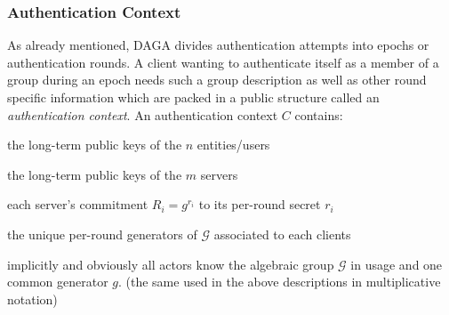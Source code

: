     \subsubsection{Authentication Context}
    \label{subsubsec:dagacontext}
    As already mentioned, DAGA divides authentication attempts into epochs or authentication rounds.
    A client wanting to authenticate itself as a member of a group during an epoch needs such a group description
    as well as other round specific information which are packed in a public structure called an \emph{authentication context}.
    \newline
    An authentication context \(C\) contains:
    \begin{description}[font=\boldmath]
        \item[\(\vec{X}\):]
            the long-term public keys of the \(n\) entities/users
        \item[\(\vec{Y}\):]
            the long-term public keys of the \(m\) servers
        \item[\textbf{\(\vec{R} = \{R_1, \ldots, R_m\}\)}:]
            each server's commitment \(R_i=g^{r_i}\) to its per-round secret \(r_i\)
        \item[\(\vec{H}= \{h_1, \ldots, h_n\}\):]
            the unique per-round generators of \(\mathcal{G}\) associated to each clients
        \item[\(\mathcal{G}\) and \(g\):]
            implicitly and obviously all actors know the algebraic group \(\mathcal{G}\) in usage and one common generator \(g\). (the same used in the above descriptions in multiplicative notation)
    \end{description}

